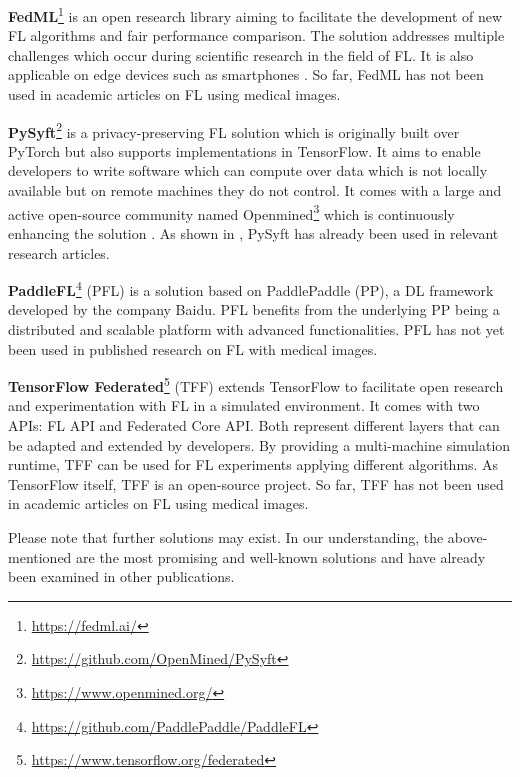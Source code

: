 \textbf{FedML}\footnote{\url{https://fedml.ai/}}
is an open research library aiming to facilitate the development of new FL algorithms and fair performance comparison. The solution addresses multiple challenges which occur during scientific research in the field of FL. It is also applicable on edge devices such as smartphones \citep{He2020FedML:Learning}.
So far, FedML has not been used in academic articles on FL using medical images.

\textbf{PySyft}\footnote{\url{https://github.com/OpenMined/PySyft}}
is a privacy-preserving FL solution which is originally built over PyTorch but also supports implementations in TensorFlow. It aims to enable developers to write software which can compute over data which is not locally available but on remote machines they do not control. It comes with a large and active open-source community named Openmined\footnote{\url{https://www.openmined.org/}} which is continuously enhancing the solution \citep{Ryffel2018ALearning}. As shown in , PySyft has already been used in relevant research articles.

\textbf{PaddleFL}\footnote{\url{https://github.com/PaddlePaddle/PaddleFL}}
(PFL) is a solution based on PaddlePaddle (PP), a DL framework developed by the company Baidu. PFL benefits from the underlying PP being a distributed and scalable platform with advanced functionalities.
PFL has not yet been used in published research on FL with medical images.

\textbf{TensorFlow Federated}\footnote{\url{https://www.tensorflow.org/federated}}
(TFF) extends TensorFlow to facilitate open research and experimentation with FL in a simulated environment. It comes with two APIs: FL API and Federated Core API. Both represent different layers that can be adapted and extended by developers. By providing a multi-machine simulation runtime, TFF can be used for FL experiments applying different algorithms. As TensorFlow itself, TFF is an open-source project. So far, TFF has not been used in academic articles on FL using medical images.

Please note that further solutions may exist. In our understanding, the above-mentioned are the most promising and well-known solutions and have already been examined in other publications.%



